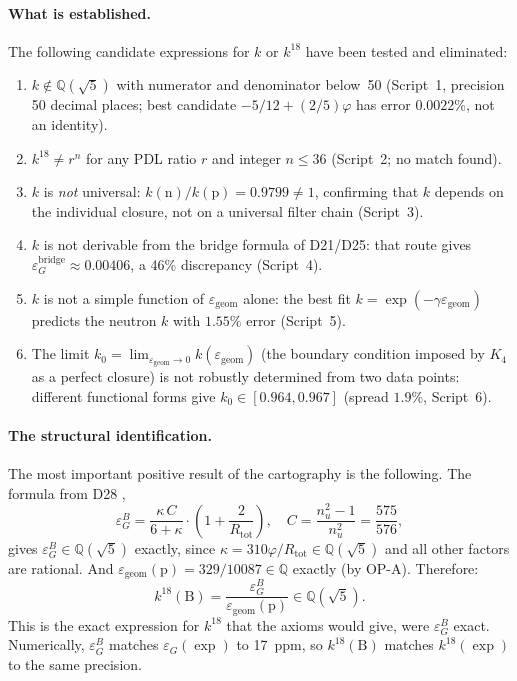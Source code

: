 \documentclass[12pt,a4paper]{article}
\theoremstyle{plain}
\theoremstyle{definition}
\theoremstyle{remark}
\newcommand{\Kfour}{K_4}
\newcommand{\vp}{\varphi}
\newcommand{\kap}{\kappa}
\newcommand{\Rtot}{R_{\mathrm{tot}}}
\newcommand{\egeom}{\varepsilon_{\mathrm{geom}}}
\newcommand{\eG}{\varepsilon_G}
\newcommand{\eGB}{\varepsilon_G^B}
\begin{document}
\paragraph{What is established.} The following candidate expressions for $k$ or $k^{18}$ have been tested and eliminated:
\begin{enumerate}[nosep]
\item $k \notin \mathbb{Q}(\sqrt{5})$ with numerator and denominator below~50 (Script~1, precision 50 decimal places; best candidate $-5/12+(2/5)\vp$ has error $0.0022\%$, not an identity).
\item $k^{18} \neq r^n$ for any PDL ratio $r$ and integer $n\leq 36$ (Script~2; no match found).
\item $k$ is \emph{not} universal: $k(\mathrm{n})/k(\mathrm{p})=0.9799\neq 1$, confirming that $k$ depends on the individual closure, not on a universal filter chain (Script~3).
\item $k$ is not derivable from the bridge formula of D21/D25: that route gives $\eG^{\mathrm{bridge}}\approx 0.00406$, a 46\% discrepancy (Script~4).
\item $k$ is not a simple function of $\egeom$ alone: the best fit $k=\exp(-\gamma\egeom)$ predicts the neutron $k$ with $1.55\%$ error (Script~5).
\item The limit $k_0=\lim_{\egeom\to 0}k(\egeom)$ (the boundary condition imposed by $\Kfour$ as a perfect closure) is not robustly determined from two data points: different functional forms give $k_0\in[0.964,0.967]$ (spread $1.9\%$, Script~6).
\end{enumerate}

\paragraph{The structural identification.} The most important positive result of the cartography is the following. The formula from D28 \citep{D28},
\[
\eGB = \frac{\kap\, C}{6+\kap}\cdot\left(1+\frac{2}{\Rtot}\right),\quad C=\frac{n_u^2-1}{n_u^2}=\frac{575}{576},
\]
gives $\eGB \in \mathbb{Q}(\sqrt{5})$ exactly, since $\kap = 310\vp/\Rtot \in \mathbb{Q}(\sqrt{5})$ and all other factors are rational. And $\egeom(\mathrm{p})=329/10087\in\mathbb{Q}$ exactly (by OP-A). Therefore:
\[
k^{18}(\mathrm{B}) = \frac{\eGB}{\egeom(\mathrm{p})} \in \mathbb{Q}(\sqrt{5}).
\]
This is the exact expression for $k^{18}$ that the axioms would give, were $\eGB$ exact. Numerically, $\eGB$ matches $\eG(\exp)$ to 17~ppm, so $k^{18}(\mathrm{B})$ matches $k^{18}(\exp)$ to the same precision.
\end{document}
